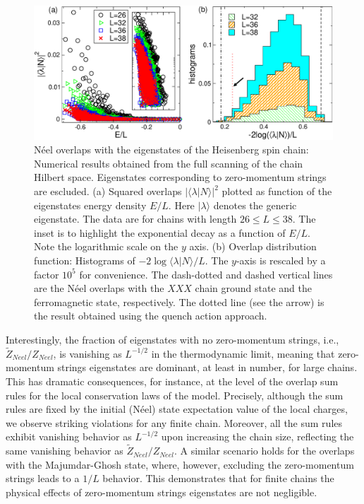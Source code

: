 \documentclass[11pt]{iopart}
\begin{document}
\begin{figure}[t]
\begin{center}
\includegraphics[width=.9\textwidth]{./draft_figs/Neel_overlaps}
\end{center}
\caption{ N\'eel overlaps with the eigenstates of the Heisenberg spin 
 chain: Numerical results obtained from the full scanning of the chain 
 Hilbert space. Eigenstates corresponding to zero-momentum strings are 
 escluded. (a) Squared overlaps $|\langle\lambda|N\rangle|^2$ plotted as 
 function of the eigenstates energy density $E/L$. Here $|\lambda\rangle$ 
 denotes the generic eigenstate. The data are for chains with length $26
 \le L\le 38$. The inset is to highlight the exponential decay as a 
 function of $E/L$. Note the logarithmic scale on the $y$ axis. (b) 
 Overlap distribution function: Histograms of $-2\log\langle\lambda|N\rangle/L$. 
 The $y$-axis is rescaled by a factor $10^5$ for convenience. The dash-dotted 
 and dashed vertical lines are the N\'eel overlaps with the $XXX$ chain ground 
 state and the ferromagnetic state, respectively. The dotted line (see 
 the arrow) is the result obtained using the quench action approach. 
}
\label{fig0:neel-ov}
\end{figure}

Interestingly, the fraction of eigenstates with no zero-momentum strings, i.e.,  
$\widetilde Z_{Neel}/Z_{Neel}$, is vanishing as $L^{-1/2}$ in the thermodynamic 
limit, meaning that zero-momentum strings eigenstates are dominant, at least 
in number, for large chains. This has dramatic consequences, for instance, at 
the level of the overlap sum rules for the local conservation laws of the model. 
Precisely, although the sum rules are fixed by the initial (N\'eel) state 
expectation value of the local charges, we observe striking violations for 
any finite chain. Moreover, all the sum rules exhibit vanishing behavior as 
$L^{-1/2}$ upon increasing the chain size, reflecting the same vanishing behavior 
as $\widetilde Z_{Neel}/Z_{Neel}$. A similar scenario holds for the overlaps with 
the Majumdar-Ghosh state, where, however, excluding the zero-momentum strings leads 
to a $1/L$ behavior. This demonstrates that for finite chains the physical effects 
of zero-momentum strings eigenstates are not negligible. 
\end{document}

